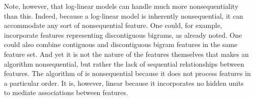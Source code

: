 Note, however, that log-linear models can handle much more nonsequentiality than this. Indeed, because a log-linear model is inherently nonsequential, it can accommodate any sort of nonsequential feature. 
One could, for example, incorporate
features representing discontiguous bigrams,
as already noted.
 One could also combine contiguous and discontiguous bigram features in the same feature set.
And yet it is not the nature of the features themselves that makes an algorithm nonsequential, but rather the lack of sequential relationships between features. The algorithm of \cite{poon-et-al:2009} is nonsequential because it does not process features in a particular order.
It is, however, linear because it incorporates no hidden units to mediate associations between features.


